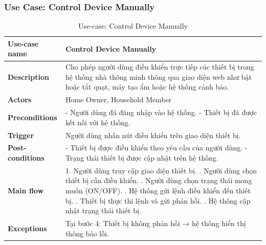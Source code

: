 \documentclass[a4paper,twoside]{article}
\begin{document}
\subsubsection{Use Case: Control Device Manually}
\begin{table}[H]
\centering
\begin{tabular}{|p{4cm}|p{11cm}|}
\hline
\textbf{Use-case name} & Control Device Manually \\ \hline

\textbf{Description} &
Cho phép người dùng điều khiển trực tiếp các thiết bị
trong hệ thống nhà thông minh thông qua giao diện web
như bật hoặc tắt quạt, máy tạo ẩm hoặc hệ thống cảnh báo. \\ \hline

\textbf{Actors} &
Home Owner, Household Member \\ \hline

\textbf{Preconditions} &
- Người dùng đã đăng nhập vào hệ thống. \newline
- Thiết bị đã được kết nối với hệ thống. \\ \hline

\textbf{Trigger} &
Người dùng nhấn nút điều khiển trên giao diện thiết bị. \\ \hline

\textbf{Post-conditions} &
- Thiết bị được điều khiển theo yêu cầu của người dùng. \newline
- Trạng thái thiết bị được cập nhật trên hệ thống. \\ \hline

\textbf{Main flow} &
1. Người dùng truy cập giao diện thiết bị. \newline
2. Người dùng chọn thiết bị cần điều khiển. \newline
3. Người dùng chọn trạng thái mong muốn (ON/OFF). \newline
4. Hệ thống gửi lệnh điều khiển đến thiết bị. \newline
5. Thiết bị thực thi lệnh và gửi phản hồi. \newline
6. Hệ thống cập nhật trạng thái thiết bị. \\ \hline

\textbf{Exceptions} &
Tại bước 4: Thiết bị không phản hồi → hệ thống hiển thị thông báo lỗi. \\ \hline
\end{tabular}
\caption{Use-case: Control Device Manually}
\end{table}


\end{document}
